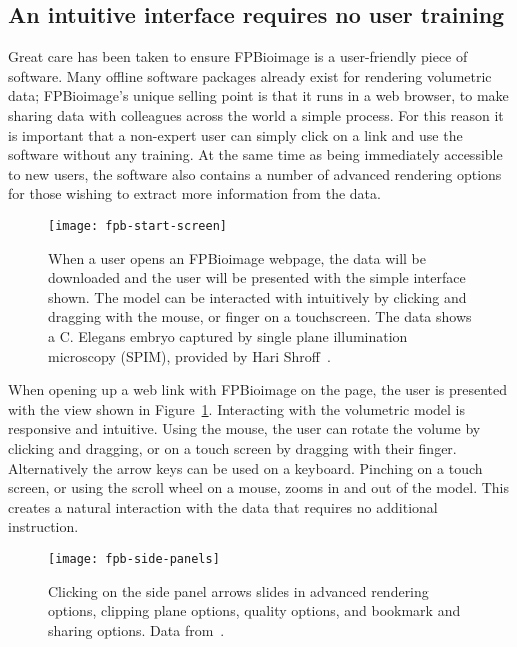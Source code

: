 \subsection{An intuitive interface requires no user training}
Great care has been taken to ensure FPBioimage is a user-friendly piece of software.
Many offline software packages already exist for rendering volumetric data; FPBioimage's unique selling point is that it runs in a web browser, to make sharing data with colleagues across the world a simple process.
For this reason it is important that a non-expert user can simply click on a link and use the software without any training.
At the same time as being immediately accessible to new users, the software also contains a number of advanced rendering options for those wishing to extract more information from the data.

\begin{figure}[htbp!]
\centering
\texttt{[image: fpb-start-screen]}
\caption[FPBioimage: Users are presented with a simple interface which is intuitive to use]{When a user opens an FPBioimage webpage, the data will be downloaded and the user will be presented with the simple interface shown. The model can be interacted with intuitively by clicking and dragging with the mouse, or finger on a touchscreen. The data shows a C. Elegans embryo captured by single plane illumination microscopy (SPIM), provided by Hari Shroff~\cite{kumar2014dual}. }
\label{fig:FPBhome}
\end{figure}

When opening up a web link with FPBioimage on the page, the user is presented with the view shown in Figure~\ref{fig:FPBhome}.
Interacting with the volumetric model is responsive and intuitive.
Using the mouse, the user can rotate the volume by clicking and dragging, or on a touch screen by dragging with their finger.
Alternatively the arrow keys can be used on a keyboard.
Pinching on a touch screen, or using the scroll wheel on a mouse, zooms in and out of the model.
This creates a natural interaction with the data that requires no additional instruction.

\begin{figure}[htbp!]
\centering
\texttt{[image: fpb-side-panels]}
\caption[FPBioimage: Side panels provide more advanced rendering options]{Clicking on the side panel arrows slides in advanced rendering options, clipping plane options, quality options, and bookmark and sharing options. Data from~\cite{kumar2014dual}. } %
\label{fig:FPBpanels}
\end{figure}

